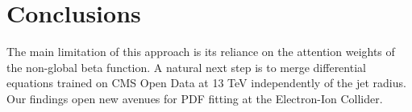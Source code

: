 \section{Conclusions}\label{sec:conclusions}

The main limitation of this approach is its reliance on the attention
weights of the non-global beta function. A natural next step is to merge
differential equations trained on CMS Open Data at 13 TeV independently
of the jet radius. Our findings open new avenues for PDF fitting at the
Electron-Ion Collider.

